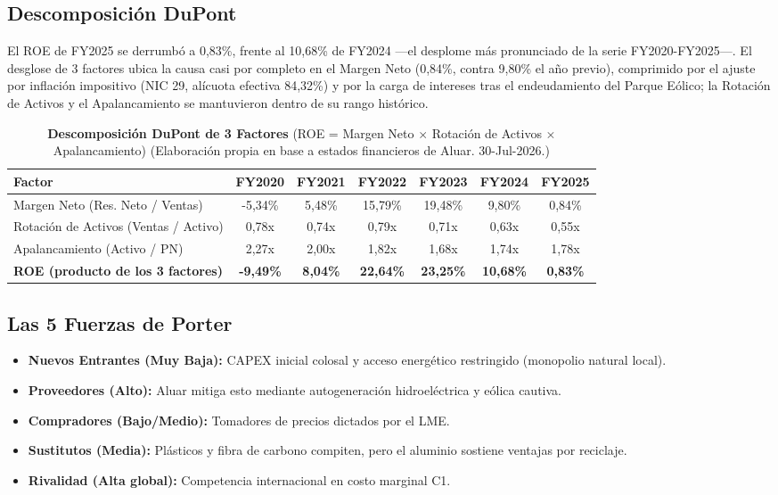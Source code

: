 \documentclass[10pt,a4paper]{article}
\begin{document}
\subsection{Descomposición DuPont}
El ROE de FY2025 se derrumbó a 0,83\%, frente al 10,68\% de FY2024 —el desplome más pronunciado de la serie FY2020-FY2025—. El desglose de 3 factores ubica la causa casi por completo en el Margen Neto (0,84\%, contra 9,80\% el año previo), comprimido por el ajuste por inflación impositivo (NIC 29, alícuota efectiva 84,32\%) y por la carga de intereses tras el endeudamiento del Parque Eólico; la Rotación de Activos y el Apalancamiento se mantuvieron dentro de su rango histórico.

\begin{table}[H]
\centering
\caption{\textbf{Descomposición DuPont de 3 Factores} (ROE = Margen Neto $\times$ Rotación de Activos $\times$ Apalancamiento) {\small\color{gsgray} (Elaboración propia en base a estados financieros de Aluar. 30-Jul-2026.)}}
\small
\begin{tabular}{lcccccc}
\toprule
\textbf{Factor} & \textbf{FY2020} & \textbf{FY2021} & \textbf{FY2022} & \textbf{FY2023} & \textbf{FY2024} & \textbf{FY2025} \\
\midrule
Margen Neto (Res. Neto / Ventas) & -5,34\% & 5,48\% & 15,79\% & 19,48\% & 9,80\% & 0,84\% \\
Rotación de Activos (Ventas / Activo) & 0,78x & 0,74x & 0,79x & 0,71x & 0,63x & 0,55x \\
Apalancamiento (Activo / PN) & 2,27x & 2,00x & 1,82x & 1,68x & 1,74x & 1,78x \\
\midrule
\textbf{ROE (producto de los 3 factores)} & \textbf{-9,49\%} & \textbf{8,04\%} & \textbf{22,64\%} & \textbf{23,25\%} & \textbf{10,68\%} & \textbf{0,83\%} \\
\bottomrule
\end{tabular}
\end{table}

\subsection{Las 5 Fuerzas de Porter}
\begin{itemize}
    \item \textbf{Nuevos Entrantes (Muy Baja):} CAPEX inicial colosal y acceso energético restringido (monopolio natural local).
    \item \textbf{Proveedores (Alto):} Aluar mitiga esto mediante autogeneración hidroeléctrica y eólica cautiva.
    \item \textbf{Compradores (Bajo/Medio):} Tomadores de precios dictados por el LME.
    \item \textbf{Sustitutos (Media):} Plásticos y fibra de carbono compiten, pero el aluminio sostiene ventajas por reciclaje.
    \item \textbf{Rivalidad (Alta global):} Competencia internacional en costo marginal C1.
\end{itemize}
\end{document}
